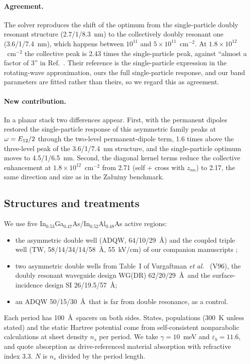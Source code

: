 \documentclass[11pt]{article}
\let\hbar\relax\DeclareRobustCommand{\hbar}{{\mathchar'26\mkern-9mu h}}
\begin{document}
\paragraph{Agreement.} The solver reproduces the shift of the optimum from the single-particle doubly resonant structure (2.7/1/8.3~nm) to the collectively doubly resonant one (3.6/1/7.4~nm), which happens between $10^{11}$ and $5\times10^{11}$~cm$^{-2}$. At $1.8\times10^{12}$~cm$^{-2}$ the collective peak is 2.43 times the single-particle peak, against ``almost a factor of 3'' in Ref.~\cite{Krieguer2024}. Their reference is the single-particle expression in the rotating-wave approximation, ours the full single-particle response, and our band parameters are fitted rather than theirs, so we regard this as agreement.

\paragraph{New contribution.} In a planar stack two differences appear. First, with the permanent dipoles restored the single-particle response of this asymmetric family peaks at $\hbar\omega=E_{12}/2$ through the two-level permanent-dipole term, 1.6 times above the three-level peak of the 3.6/1/7.4~nm structure, and the single-particle optimum moves to 4.5/1/6.5~nm. Second, the diagonal kernel terms reduce the collective enhancement at $1.8\times10^{12}$~cm$^{-2}$ from 2.71 (self + cross with $z_{nn}$) to 2.17, the same direction and size as in the Załużny benchmark.

\subsection{Structures and treatments}
We use five In$_{0.53}$Ga$_{0.47}$As/In$_{0.52}$Al$_{0.48}$As active regions:
\begin{itemize}
\item the asymmetric double well (ADQW, 64/10/29~\AA) and the coupled triple well (TW, 58/14/34/14/58~\AA, 55~kV/cm) of our companion manuscripts \cite{OwnbyN1,OwnbyNL02};
\item two asymmetric double wells from Table~I of Vurgaftman \emph{et al.}\ \cite{Vurgaftman1996} (V96), the doubly resonant waveguide design WG(DR) 62/20/29~\AA\ and the surface-incidence design SI 26/19.5/57~\AA;
\item an ADQW 50/15/30~\AA\ that is far from double resonance, as a control.
\end{itemize}
Each period has 100~\AA\ spacers on both sides. States, populations (300~K unless stated) and the static Hartree potential come from self-consistent nonparabolic calculations at sheet density $n_s$ per period. We take $\gamma=10$~meV and $\varepsilon_b=11.6$, and quote absorption as drive-referenced material absorption with refractive index 3.3. $N$ is $n_s$ divided by the period length.
\end{document}
